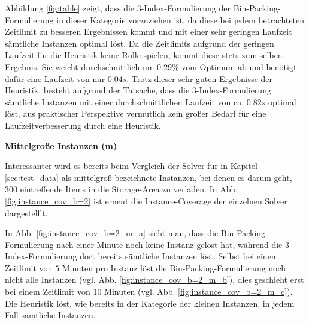 Abbildung \ref{fig:table} zeigt, dass die 3-Index-Formulierung der Bin-Packing-Formulierung in dieser Kategorie vorzuziehen ist,
da diese bei jedem betrachteten Zeitlimit zu besseren Ergebnissen kommt und mit einer sehr geringen Laufzeit sämtliche Instanzen
optimal löst. Da die Zeitlimits aufgrund der geringen Laufzeit für die Heuristik keine Rolle spielen, kommt diese stets zum selben Ergebnis. Sie weicht durchschnittlich um $0.29 \%$ vom Optimum ab und benötigt dafür eine Laufzeit von nur $0.04s$.
Trotz dieser sehr guten Ergebnisse der Heuristik, besteht aufgrund der Tatsache, dass die 3-Index-Formulierung sämtliche Instanzen
mit einer durchschnittlichen Laufzeit von ca. $0.82s$ optimal löst, aus praktischer Perspektive vermutlich kein großer Bedarf für
eine Laufzeitverbesserung durch eine Heuristik.

\textbf{Mittelgroße Instanzen (m)}

Interessanter wird es bereits beim Vergleich der Solver für in Kapitel \ref{sec:test_data} als mittelgroß bezeichnete Instanzen,
bei denen es darum geht, $300$ eintreffende Items in die Storage-Area zu verladen.
In Abb. \ref{fig:instance_cov_b=2} ist erneut die Instance-Coverage der einzelnen Solver dargestelllt.

In Abb. \ref{fig:instance_cov_b=2_m_a} sieht man, dass die Bin-Packing-Formulierung nach einer Minute noch keine Instanz gelöst hat, während die 3-Index-Formulierung dort bereits sämtliche Instanzen löst. Selbst bei einem Zeitlimit von $5$ Minuten pro Instanz löst die Bin-Packing-Formulierung noch nicht alle Instanzen (vgl. Abb. \ref{fig:instance_cov_b=2_m_b}),
dies geschieht erst bei einem Zeitlimit von $10$ Minuten (vgl. Abb. \ref{fig:instance_cov_b=2_m_c}).
Die Heuristik löst, wie bereits in der Kategorie der kleinen Instanzen, in jedem Fall sämtliche Instanzen.

